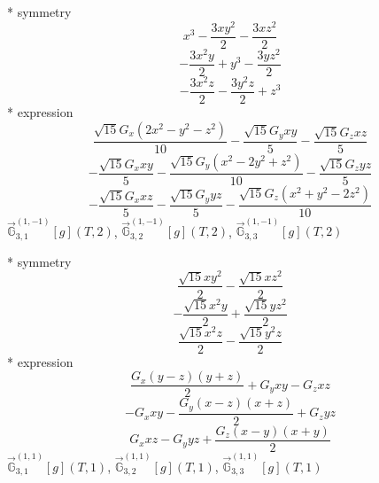 \documentclass[fleqn,8pt]{jsarticle}
\begin{document}
\noindent\quad ** symmetry
\begin{dmath*}
x^{3} - \frac{3 x y^{2}}{2} - \frac{3 x z^{2}}{2}
\end{dmath*}
\begin{dmath*}
- \frac{3 x^{2} y}{2} + y^{3} - \frac{3 y z^{2}}{2}
\end{dmath*}
\begin{dmath*}
- \frac{3 x^{2} z}{2} - \frac{3 y^{2} z}{2} + z^{3}
\end{dmath*}
\noindent\quad ** expression
\begin{dmath*}
\frac{\sqrt{15} G_{x} \left(2 x^{2} - y^{2} - z^{2}\right)}{10} - \frac{\sqrt{15} G_{y} x y}{5} - \frac{\sqrt{15} G_{z} x z}{5}
\end{dmath*}
\begin{dmath*}
- \frac{\sqrt{15} G_{x} x y}{5} - \frac{\sqrt{15} G_{y} \left(x^{2} - 2 y^{2} + z^{2}\right)}{10} - \frac{\sqrt{15} G_{z} y z}{5}
\end{dmath*}
\begin{dmath*}
- \frac{\sqrt{15} G_{x} x z}{5} - \frac{\sqrt{15} G_{y} y z}{5} - \frac{\sqrt{15} G_{z} \left(x^{2} + y^{2} - 2 z^{2}\right)}{10}
\end{dmath*}
\noindent\quad $\vec{\mathbb{G}}_{3,1}^{(1,-1)}[g](T,2)$, $\vec{\mathbb{G}}_{3,2}^{(1,-1)}[g](T,2)$, $\vec{\mathbb{G}}_{3,3}^{(1,-1)}[g](T,2)$

\noindent\quad ** symmetry
\begin{dmath*}
\frac{\sqrt{15} x y^{2}}{2} - \frac{\sqrt{15} x z^{2}}{2}
\end{dmath*}
\begin{dmath*}
- \frac{\sqrt{15} x^{2} y}{2} + \frac{\sqrt{15} y z^{2}}{2}
\end{dmath*}
\begin{dmath*}
\frac{\sqrt{15} x^{2} z}{2} - \frac{\sqrt{15} y^{2} z}{2}
\end{dmath*}
\noindent\quad ** expression
\begin{dmath*}
\frac{G_{x} \left(y - z\right) \left(y + z\right)}{2} + G_{y} x y - G_{z} x z
\end{dmath*}
\begin{dmath*}
- G_{x} x y - \frac{G_{y} \left(x - z\right) \left(x + z\right)}{2} + G_{z} y z
\end{dmath*}
\begin{dmath*}
G_{x} x z - G_{y} y z + \frac{G_{z} \left(x - y\right) \left(x + y\right)}{2}
\end{dmath*}
\noindent\quad $\vec{\mathbb{G}}_{3,1}^{(1,1)}[g](T,1)$, $\vec{\mathbb{G}}_{3,2}^{(1,1)}[g](T,1)$, $\vec{\mathbb{G}}_{3,3}^{(1,1)}[g](T,1)$
\end{document}
